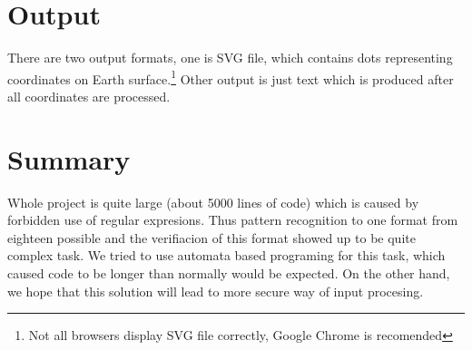 \documentclass[12pt,titlepage]{article}
\begin{document}
\section{Output}
There are two output formats, one is SVG file, which contains dots representing coordinates on Earth surface.\footnote{Not all browsers display SVG file correctly, Google Chrome is recomended} Other output is just text which is produced after all coordinates are processed. 

\section{Summary}

Whole project is quite large (about 5000 lines of code) which is caused by forbidden use of regular expresions. Thus pattern recognition to one 
format from eighteen possible and the verifiacion of this format showed up to be quite complex task. We tried to use automata based programing 
for this task, which caused code to be longer than normally would be expected. On the other hand, we hope that this solution will lead to more 
secure way of input procesing.
\end{document}
